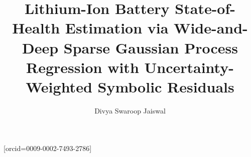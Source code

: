 \documentclass[a4paper,fleqn]{cas-sc}
\begin{document}
\let\WriteBookmarks\relax


\title[mode = title]{Lithium-Ion Battery State-of-Health Estimation via Wide-and-Deep Sparse Gaussian Process Regression with Uncertainty-Weighted Symbolic Residuals}

\author[1]{Divya Swaroop Jaiswal}[orcid=0009-0002-7493-2786]
\cormark[1]

\address[1]{Department of Computer Science and Engineering, Indian Institute of Technology Patna, Patna, 801106, India}

\end{document}
